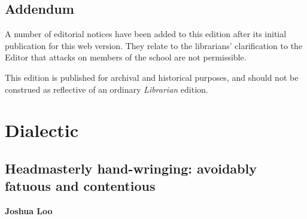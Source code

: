 \documentclass[12pt,a4paper]{report}
\begin{document}
\section{Addendum}

\begin{multicols}{2}
A number of editorial notices have been added to this edition after its initial publication for this web version. They relate to the librarians' clarification to the Editor that attacks on members of the school are not permissible. 

This edition is published for archival and historical purposes, and should not be construed as reflective of an ordinary \textit{Librarian} edition. 
\end{multicols}

\chapter{Dialectic}

\section{Headmasterly hand-wringing: avoidably fatuous and contentious}

\textbf{Joshua Loo}
\end{document}
